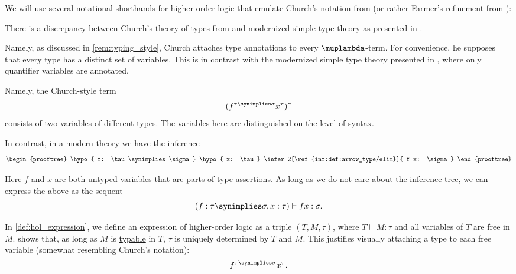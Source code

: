 \begin{remark}\label{rem:hol_notational_shorthands}
  We will use several notational shorthands for higher-order logic that emulate Church's notation from \cite{Church1940STT} (or rather Farmer's refinement from \cite{Farmer2008STTVirtues}):

  \begin{thmenum}
     There is a discrepancy between Church's theory of types from \cite{Church1940STT} and modernized simple type theory as presented in .

    Namely, as discussed in \cref{rem:typing_style}, Church attaches type annotations to every \( \muplambda \)-term. For convenience, he supposes that every type has a distinct set of variables. This is in contrast with the modernized simple type theory presented in , where only quantifier variables are annotated.

    Namely, the Church-style term
    \begin{equation*}
      (f^{\tau \synimplies \sigma} x^\tau)^\sigma
    \end{equation*}
    consists of two variables of different types. The variables here are distinguished on the level of syntax.

    In contrast, in a modern theory we have the inference
    \begin{equation*}
      \begin{prooftree}
        \hypo{ f: \tau \synimplies \sigma }
        \hypo{ x: \tau }
        \infer2[\ref{inf:def:arrow_type/elim}]{ f x: \sigma }
      \end{prooftree}
    \end{equation*}

    Here \( f \) and \( x \) are both untyped variables that are parts of type assertions. As long as we do not care about the inference tree, we can express the above as the sequent
    \begin{equation*}
      (f: \tau \synimplies \sigma, x: \tau) \vdash f x: \sigma.
    \end{equation*}

    In \cref{def:hol_expression}, we define an expression of higher-order logic as a triple \( (T, M, \tau) \), where \( T \vdash M: \tau \) and all variables of \( T \) are free in \( M \).  shows that, as long as \( M \) is \hyperref[def:typability]{typable} in \( T \), \( \tau \) is uniquely determined by \( T \) and \( M \). This justifies visually attaching a type to each free variable (somewhat resembling Church's notation):
    \begin{equation*}
      f^{\tau \synimplies \sigma} x^\tau.
    \end{equation*}


\end{thmenum}
\end{remark}
